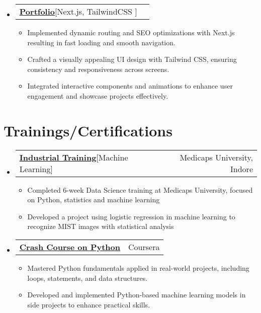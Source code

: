 \documentclass[letterpaper,11pt]{article}
\makeatletter
\newcommand{\resumeItem}[1]{
    \item\small{
      {#1 \vspace{-2pt}}
    }
  }
\newcommand{\resumeCertheading}[2]{
    \vspace{5pt}\item
      \begin{tabular*}{0.97\textwidth}[t]{l@{\extracolsep{\fill}}r}
        {#1} & #2 \\
      \end{tabular*}\vspace{-7pt}
  }
\newcommand{\resumeSubSubheading}[2]{
      \item
      \begin{tabular*}{0.97\textwidth}{l@{\extracolsep{\fill}}r}
        \textit{\small#1} & \textit{\small #2} \\
      \end{tabular*}\vspace{-7pt}
  }
\newcommand{\resumeProjectHeading}[2]{
      \item
      \begin{tabular*}{0.97\textwidth}{l@{\extracolsep{\fill}}r}
        \small#1 & #2 \\
      \end{tabular*}\vspace{-7pt}
  }
\newcommand{\resumeSubHeadingListStart}{\begin{itemize}[leftmargin=0.15in, label={}]}
\newcommand{\resumeSubHeadingListEnd}{\end{itemize}}
\newcommand{\resumeItemListStart}{\begin{itemize}}
\newcommand{\resumeItemListEnd}{\end{itemize}\vspace{-5pt}}
\makeatother
\begin{document}
\resumeSubHeadingListStart
\resumeProjectHeading
{\textbf{\href{https://github.com/shanutiwari1010/portfolio}{Portfolio}\hspace{5pt}}{{[Next.js, TailwindCSS ]}}}{}
\resumeItemListStart
\resumeItem{Implemented dynamic routing and SEO optimizations with Next.js resulting in fast loading and smooth navigation.}
\resumeItem{Crafted a visually appealing UI design with Tailwind CSS, ensuring consistency and responsiveness across screens.}
\resumeItem{Integrated interactive components and animations to enhance user engagement and showcase projects effectively.}
\resumeItemListEnd
\resumeSubHeadingListEnd


\section{Trainings/Certifications}
\resumeSubHeadingListStart

\resumeCertheading
{\textbf{\href{https://medicaps.ac.in/}{Industrial Training}\hspace{5pt}}{{[Machine Learning]}}}{Medicaps University, Indore}
\resumeItemListStart
\resumeItem{Completed 6-week Data Science training at Medicaps University, focused on Python, statistics and machine learning}
\resumeItem{Developed a project using logistic regression in machine learning to recognize MIST images with statistical analysis}
\resumeItemListEnd

\resumeCertheading
{\textbf{\href{https://coursera.org/verify/FHDUZAK7YL3Q}{Crash Course on Python}\hspace{3pt}}{{}}}{Coursera}
\resumeItemListStart
\resumeItem{Mastered Python fundamentals applied in real-world projects, including loops, statements, and data structures.}
\resumeItem{Developed and implemented Python-based machine learning models in side projects to enhance practical skills.}
\resumeItemListEnd
\resumeSubHeadingListEnd
\end{document}
